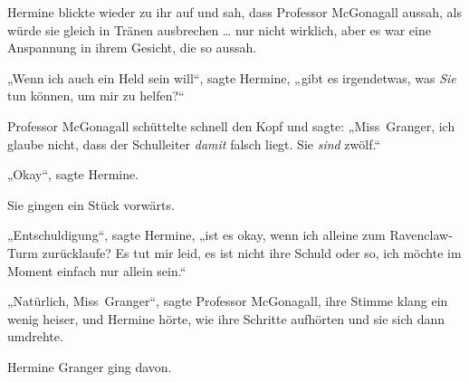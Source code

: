 Hermine blickte wieder zu ihr auf und sah, dass Professor McGonagall aussah, als würde sie gleich in Tränen ausbrechen … nur nicht wirklich, aber es war eine Anspannung in ihrem Gesicht, die so aussah.

„Wenn ich auch ein Held sein will“, sagte Hermine, „gibt es irgendetwas, was \emph{Sie} tun können, um mir zu helfen?“

Professor McGonagall schüttelte schnell den Kopf und sagte:
„Miss~Granger, ich glaube nicht, dass der Schulleiter \emph{damit} falsch liegt. Sie \emph{sind} zwölf.“

„Okay“, sagte Hermine.

Sie gingen ein Stück vorwärts.

„Entschuldigung“, sagte Hermine, „ist es okay, wenn ich alleine zum Ravenclaw-Turm zurücklaufe? Es tut mir leid, es ist nicht ihre Schuld oder so, ich möchte im Moment einfach nur allein sein.“

„Natürlich, Miss~Granger“, sagte Professor McGonagall, ihre Stimme klang ein wenig heiser, und Hermine hörte, wie ihre Schritte aufhörten und sie sich dann umdrehte.

Hermine Granger ging davon.


